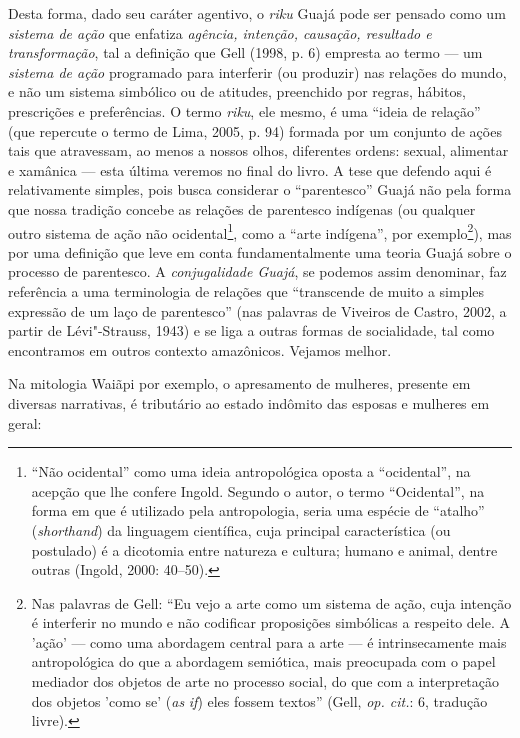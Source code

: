 Desta forma, dado seu caráter agentivo, o \emph{riku} Guajá pode ser
pensado como um \emph{sistema de ação} que enfatiza \emph{agência,
intenção, causação, resultado e transformação}, tal a definição que Gell
(1998, p. 6) empresta ao termo --- um \emph{sistema de ação} programado
para interferir (ou produzir) nas relações do mundo, e não um sistema
simbólico ou de atitudes, preenchido por regras, hábitos, prescrições e
preferências. O termo \emph{riku}, ele mesmo, é uma ``ideia de relação''
(que repercute o termo de Lima, 2005, p. 94) formada por um conjunto de
ações tais que atravessam, ao menos a nossos olhos, diferentes ordens:
sexual, alimentar e xamânica --- esta última veremos no final do livro. A
tese que defendo aqui é relativamente simples, pois busca considerar o
``parentesco'' Guajá não pela forma que nossa tradição concebe as relações
de parentesco indígenas (ou qualquer outro sistema de ação não
ocidental\footnote{``Não ocidental'' como uma ideia antropológica oposta a
  ``ocidental'', na acepção que lhe confere Ingold. Segundo o autor, o
  termo ``Ocidental'', na forma em que é utilizado pela antropologia,
  seria uma espécie de ``atalho'' (\emph{shorthand}) da linguagem
  científica, cuja principal característica (ou postulado) é a dicotomia
  entre natureza e cultura; humano e animal, dentre outras (Ingold,
  2000: 40--50).}, como a ``arte indígena'', por exemplo\footnote{Nas
  palavras de Gell: ``Eu vejo a arte como um sistema de ação, cuja
      intenção é interferir no mundo e não codificar proposições simbólicas
      a respeito dele. A 'ação' --- como uma abordagem central para a arte --- é
      intrinsecamente mais antropológica do que a abordagem semiótica, mais
      preocupada com o papel mediador dos objetos de arte no processo
      social, do que com a interpretação dos objetos 'como se' (\emph{as}
      \emph{if}) eles fossem textos'' (Gell, \emph{op. cit.}: 6, tradução livre).}),
mas por uma definição que leve em conta fundamentalmente uma teoria
Guajá sobre o processo de parentesco. A \emph{conjugalidade Guajá}, se
podemos assim denominar, faz referência a uma terminologia de relações
que ``transcende de muito a simples expressão de um laço de parentesco''
(nas palavras de Viveiros de Castro, 2002, a partir de Lévi"-Strauss,
1943) e se liga a outras formas de socialidade, tal como encontramos em
outros contexto amazônicos. Vejamos melhor.

Na mitologia Waiãpi por exemplo, o apresamento de mulheres, presente em
diversas narrativas, é tributário ao estado indômito das esposas e
mulheres em geral:

